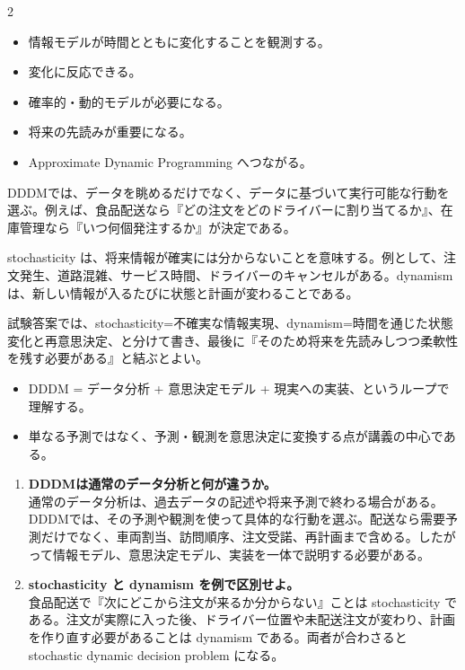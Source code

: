 \clearpage
{}
\begin{multicols}{2}\footnotesize\raggedcolumns
{}
\begin{itemize}
\item 情報モデルが時間とともに変化することを観測する。
\item 変化に反応できる。
\item 確率的・動的モデルが必要になる。
\item 将来の先読みが重要になる。
\item Approximate Dynamic Programming へつながる。
\end{itemize}
DDDMでは、データを眺めるだけでなく、データに基づいて実行可能な行動を選ぶ。例えば、食品配送なら『どの注文をどのドライバーに割り当てるか』、在庫管理なら『いつ何個発注するか』が決定である。\par

stochasticity は、将来情報が確実には分からないことを意味する。例として、注文発生、道路混雑、サービス時間、ドライバーのキャンセルがある。dynamism は、新しい情報が入るたびに状態と計画が変わることである。\par

試験答案では、stochasticity=不確実な情報実現、dynamism=時間を通じた状態変化と再意思決定、と分けて書き、最後に『そのため将来を先読みしつつ柔軟性を残す必要がある』と結ぶとよい。\par
{}
\begin{itemize}
\item DDDM = データ分析 + 意思決定モデル + 現実への実装、というループで理解する。
\item 単なる予測ではなく、予測・観測を意思決定に変換する点が講義の中心である。
\end{itemize}
\begin{enumerate}
\item \textbf{DDDMは通常のデータ分析と何が違うか。}\\通常のデータ分析は、過去データの記述や将来予測で終わる場合がある。DDDMでは、その予測や観測を使って具体的な行動を選ぶ。配送なら需要予測だけでなく、車両割当、訪問順序、注文受諾、再計画まで含める。したがって情報モデル、意思決定モデル、実装を一体で説明する必要がある。
\item \textbf{stochasticity と dynamism を例で区別せよ。}\\食品配送で『次にどこから注文が来るか分からない』ことは stochasticity である。注文が実際に入った後、ドライバー位置や未配送注文が変わり、計画を作り直す必要があることは dynamism である。両者が合わさると stochastic dynamic decision problem になる。
\end{enumerate}
\end{multicols}

